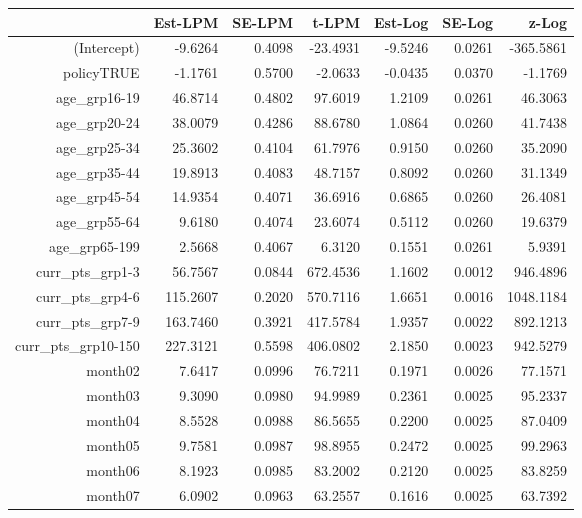 \documentclass[10pt]{article}
\begin{document}


\begin{table}[ht]
\centering
\begin{tabular}{rrrrrrr}
  \hline
 & Est-LPM & SE-LPM & t-LPM & Est-Log & SE-Log & z-Log \\ 
  \hline
(Intercept) & -9.6264 & 0.4098 & -23.4931 & -9.5246 & 0.0261 & -365.5861 \\ 
  policyTRUE & -1.1761 & 0.5700 & -2.0633 & -0.0435 & 0.0370 & -1.1769 \\ 
  age\_grp16-19 & 46.8714 & 0.4802 & 97.6019 & 1.2109 & 0.0261 & 46.3063 \\ 
  age\_grp20-24 & 38.0079 & 0.4286 & 88.6780 & 1.0864 & 0.0260 & 41.7438 \\ 
  age\_grp25-34 & 25.3602 & 0.4104 & 61.7976 & 0.9150 & 0.0260 & 35.2090 \\ 
  age\_grp35-44 & 19.8913 & 0.4083 & 48.7157 & 0.8092 & 0.0260 & 31.1349 \\ 
  age\_grp45-54 & 14.9354 & 0.4071 & 36.6916 & 0.6865 & 0.0260 & 26.4081 \\ 
  age\_grp55-64 & 9.6180 & 0.4074 & 23.6074 & 0.5112 & 0.0260 & 19.6379 \\ 
  age\_grp65-199 & 2.5668 & 0.4067 & 6.3120 & 0.1551 & 0.0261 & 5.9391 \\ 
  curr\_pts\_grp1-3 & 56.7567 & 0.0844 & 672.4536 & 1.1602 & 0.0012 & 946.4896 \\ 
  curr\_pts\_grp4-6 & 115.2607 & 0.2020 & 570.7116 & 1.6651 & 0.0016 & 1048.1184 \\ 
  curr\_pts\_grp7-9 & 163.7460 & 0.3921 & 417.5784 & 1.9357 & 0.0022 & 892.1213 \\ 
  curr\_pts\_grp10-150 & 227.3121 & 0.5598 & 406.0802 & 2.1850 & 0.0023 & 942.5279 \\ 
  month02 & 7.6417 & 0.0996 & 76.7211 & 0.1971 & 0.0026 & 77.1571 \\ 
  month03 & 9.3090 & 0.0980 & 94.9989 & 0.2361 & 0.0025 & 95.2337 \\ 
  month04 & 8.5528 & 0.0988 & 86.5655 & 0.2200 & 0.0025 & 87.0409 \\ 
  month05 & 9.7581 & 0.0987 & 98.8955 & 0.2472 & 0.0025 & 99.2963 \\ 
  month06 & 8.1923 & 0.0985 & 83.2002 & 0.2120 & 0.0025 & 83.8259 \\ 
  month07 & 6.0902 & 0.0963 & 63.2557 & 0.1616 & 0.0025 & 63.7392 \\ 

\end{tabular}
\end{table}
\end{document}

